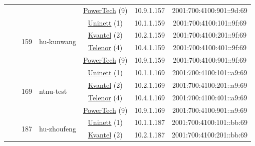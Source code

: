 \begin{small}
\begin{center}
\begin{longtable}{|c|c|c|c|c|c|c|c|}
  &  &  &  & \multicolumn{2}{|c|}{\tiny{\href{http://www.powertech.no}{PowerTech} (9)}} & \tiny{10.9.1.157} & \tiny{2001:700:4100:901::9d:69} \\* \cline{3-3}\cline{4-4}\cline{5-5}\cline{6-6}\cline{7-7}\cline{8-8}
  &  & \multirow{4}{*}{\tiny{159}} & \multicolumn{1}{|l|}{\multirow{4}{*}{\tiny{hu-kunwang}}} & \multicolumn{2}{|c|}{\tiny{\href{https://www.uninett.no}{Uninett} (1)}} & \tiny{10.1.1.159} & \tiny{2001:700:4100:101::9f:69} \\* \cline{5-5}\cline{6-6}\cline{7-7}\cline{8-8}
  &  &  &  & \multicolumn{2}{|c|}{\tiny{\href{http://kvantel.no}{Kvantel} (2)}} & \tiny{10.2.1.159} & \tiny{2001:700:4100:201::9f:69} \\* \cline{5-5}\cline{6-6}\cline{7-7}\cline{8-8}
  &  &  &  & \multicolumn{2}{|c|}{\tiny{\href{https://www.telenor.no}{Telenor} (4)}} & \tiny{10.4.1.159} & \tiny{2001:700:4100:401::9f:69} \\* \cline{5-5}\cline{6-6}\cline{7-7}\cline{8-8}
  &  &  &  & \multicolumn{2}{|c|}{\tiny{\href{http://www.powertech.no}{PowerTech} (9)}} & \tiny{10.9.1.159} & \tiny{2001:700:4100:901::9f:69} \\* \cline{3-3}\cline{4-4}\cline{5-5}\cline{6-6}\cline{7-7}\cline{8-8}
  &  & \multirow{4}{*}{\tiny{169}} & \multicolumn{1}{|l|}{\multirow{4}{*}{\tiny{ntnu-test}}} & \multicolumn{2}{|c|}{\tiny{\href{https://www.uninett.no}{Uninett} (1)}} & \tiny{10.1.1.169} & \tiny{2001:700:4100:101::a9:69} \\* \cline{5-5}\cline{6-6}\cline{7-7}\cline{8-8}
  &  &  &  & \multicolumn{2}{|c|}{\tiny{\href{http://kvantel.no}{Kvantel} (2)}} & \tiny{10.2.1.169} & \tiny{2001:700:4100:201::a9:69} \\* \cline{5-5}\cline{6-6}\cline{7-7}\cline{8-8}
  &  &  &  & \multicolumn{2}{|c|}{\tiny{\href{https://www.telenor.no}{Telenor} (4)}} & \tiny{10.4.1.169} & \tiny{2001:700:4100:401::a9:69} \\* \cline{5-5}\cline{6-6}\cline{7-7}\cline{8-8}
  &  &  &  & \multicolumn{2}{|c|}{\tiny{\href{http://www.powertech.no}{PowerTech} (9)}} & \tiny{10.9.1.169} & \tiny{2001:700:4100:901::a9:69} \\* \cline{3-3}\cline{4-4}\cline{5-5}\cline{6-6}\cline{7-7}\cline{8-8}
  &  & \multirow{4}{*}{\tiny{187}} & \multicolumn{1}{|l|}{\multirow{4}{*}{\tiny{hu-zhoufeng}}} & \multicolumn{2}{|c|}{\tiny{\href{https://www.uninett.no}{Uninett} (1)}} & \tiny{10.1.1.187} & \tiny{2001:700:4100:101::bb:69} \\* \cline{5-5}\cline{6-6}\cline{7-7}\cline{8-8}
  &  &  &  & \multicolumn{2}{|c|}{\tiny{\href{http://kvantel.no}{Kvantel} (2)}} & \tiny{10.2.1.187} & \tiny{2001:700:4100:201::bb:69} \\* \cline{5-5}\cline{6-6}\cline{7-7}\cline{8-8}

\end{longtable}
\end{center}
\end{small}
